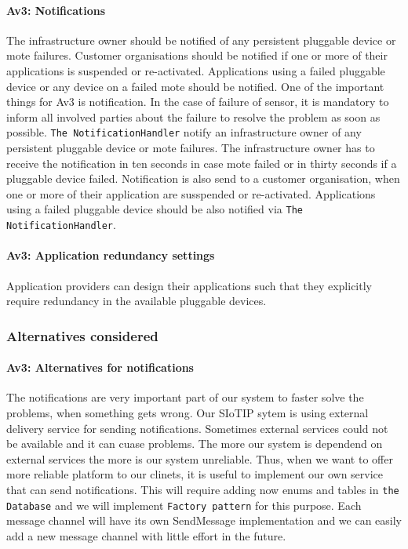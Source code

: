     \paragraph{Av3: Notifications}
        The infrastructure owner should be notified of any persistent pluggable device or mote
        failures. Customer organisations should be notified if one or more of their applications is suspended
        or re-activated. Applications using a failed pluggable device or any device on a failed mote should be
        notified.
        One of the important things for Av3 is notification. In the case
        of failure of sensor, it is mandatory to inform all involved parties
         about the failure to resolve the problem as soon as possible.
        \texttt{The NotificationHandler} notify an infrastructure owner of
        any persistent pluggable device or mote failures. The infrastructure
        owner has to receive the notification in ten seconds in case mote failed or
        in thirty seconds if a pluggable device failed. Notification is also send
        to a customer organisation, when one or more of their application are
        susspended or re-activated. Applications using a failed  pluggable
        device should be also notified via \texttt{The NotificationHandler}.

    \paragraph{Av3: Application redundancy settings}
        Application providers can design their applications such that they explicitly
        require redundancy in the available pluggable devices.

    \subsubsection{Alternatives considered}
        \paragraph{Av3: Alternatives for notifications}
            The notifications are very important part of our system to faster
            solve the problems, when something gets wrong. Our SIoTIP sytem 
            is using external delivery service for sending notifications. 
            Sometimes external services could not be available and it can cuase
            problems. The more our system is dependend on external services the more 
            is our system unreliable. Thus, when we want to offer more reliable 
            platform to our clinets, it is useful to implement our own service
            that can send notifications. This will require adding now enums and tables 
            in \texttt{the Database} and we will implement \texttt{Factory pattern} for this purpose. 
            Each message channel will have its own SendMessage 
            implementation and we can easily add a new message channel with little effort
            in the future.


